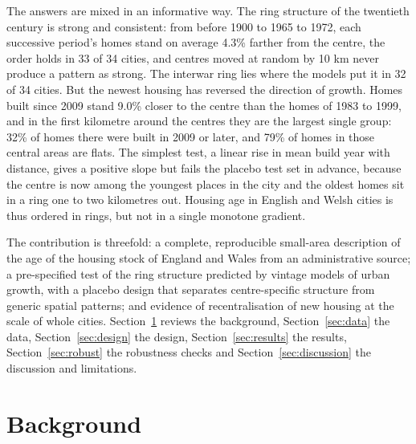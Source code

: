 \documentclass[11pt,a4paper]{article}
\begin{document}
The answers are mixed in an informative way. The ring structure of the twentieth century is strong and consistent: from before 1900 to 1965 to 1972, each successive period's homes stand on average 4.3\% farther from the centre, the order holds in 33 of 34 cities, and centres moved at random by 10 km never produce a pattern as strong. The interwar ring lies where the models put it in 32 of 34 cities. But the newest housing has reversed the direction of growth. Homes built since 2009 stand 9.0\% closer to the centre than the homes of 1983 to 1999, and in the first kilometre around the centres they are the largest single group: 32\% of homes there were built in 2009 or later, and 79\% of homes in those central areas are flats. The simplest test, a linear rise in mean build year with distance, gives a positive slope but fails the placebo test set in advance, because the centre is now among the youngest places in the city and the oldest homes sit in a ring one to two kilometres out. Housing age in English and Welsh cities is thus ordered in rings, but not in a single monotone gradient.

The contribution is threefold: a complete, reproducible small-area description of the age of the housing stock of England and Wales from an administrative source; a pre-specified test of the ring structure predicted by vintage models of urban growth, with a placebo design that separates centre-specific structure from generic spatial patterns; and evidence of recentralisation of new housing at the scale of whole cities. Section~\ref{sec:lit} reviews the background, Section~\ref{sec:data} the data, Section~\ref{sec:design} the design, Section~\ref{sec:results} the results, Section~\ref{sec:robust} the robustness checks and Section~\ref{sec:discussion} the discussion and limitations.

\section{Background}
\label{sec:lit}
\end{document}
